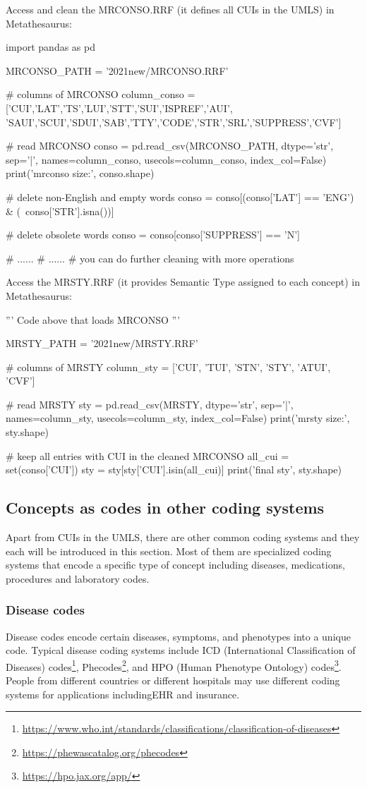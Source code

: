 Access and clean the MRCONSO.RRF (it defines all CUIs in the UMLS) in Metathesaurus:
\begin{python}
import pandas as pd

MRCONSO_PATH = '2021new/MRCONSO.RRF'

# columns of MRCONSO
column_conso = ['CUI','LAT','TS','LUI','STT','SUI','ISPREF','AUI',
'SAUI','SCUI','SDUI','SAB','TTY','CODE','STR','SRL','SUPPRESS','CVF']

# read MRCONSO
conso = pd.read_csv(MRCONSO_PATH, dtype='str', sep='|', 
        names=column_conso, usecols=column_conso, index_col=False)
print('mrconso size:', conso.shape)

# delete non-English and empty words
conso = conso[(conso['LAT'] == 'ENG') & (~conso['STR'].isna())]
    
# delete obsolete words
conso = conso[conso['SUPPRESS'] == 'N']

# ......
# ......
# you can do further cleaning with more operations
\end{python}

Access the MRSTY.RRF (it provides Semantic Type assigned to each concept) in Metathesaurus:
\begin{python}
'''
Code above that loads MRCONSO
'''

MRSTY_PATH = '2021new/MRSTY.RRF'

# columns of MRSTY
column_sty = ['CUI', 'TUI', 'STN', 'STY', 'ATUI', 'CVF']

# read MRSTY
sty = pd.read_csv(MRSTY, dtype='str', sep='|', names=column_sty, 
        usecols=column_sty, index_col=False)
print('mrsty size:', sty.shape)

# keep all entries with CUI in the cleaned MRCONSO
all_cui = set(conso['CUI'])
sty = sty[sty['CUI'].isin(all_cui)]
print('final sty', sty.shape)
\end{python}

\subsection{Concepts as codes in other coding systems}
Apart from CUIs in the UMLS, there are other common coding systems and they each will be introduced in this section. Most of them are specialized coding systems that encode a specific type of concept including diseases, medications, procedures and laboratory codes.
\subsubsection{Disease codes}
Disease codes encode certain diseases, symptoms, and phenotypes into a unique code. Typical disease coding systems include ICD (International Classification of Diseases) codes\footnote{\url{https://www.who.int/standards/classifications/classification-of-diseases}}, Phecodes\footnote{\url{https://phewascatalog.org/phecodes}}, and HPO (Human Phenotype Ontology) codes\footnote{\url{https://hpo.jax.org/app/}}. People from different countries or different hospitals may use different coding systems for applications includingEHR and insurance.

